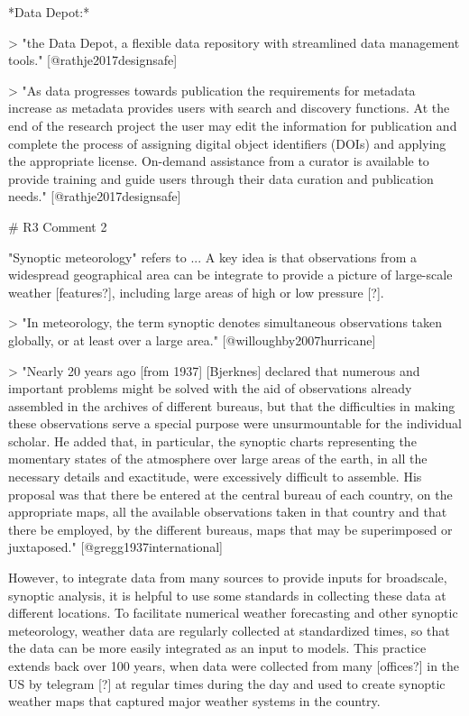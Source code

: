 *Data Depot:*

> "the Data Depot, a flexible data repository with streamlined data management
tools." [@rathje2017designsafe]

> "As data progresses towards publication the requirements for metadata 
increase as metadata provides users with search and discovery functions. At
the end of the research project the user may edit the information for 
publication and complete the process of assigning digital object identifiers
(DOIs) and applying the appropriate license. On-demand assistance from a 
curator is available to provide training and guide users through their data
curation and publication needs." [@rathje2017designsafe]

# R3 Comment 2

"Synoptic meteorology" refers to ...
A key idea is that observations from a widespread geographical area can be
integrate to provide a picture of large-scale weather [features?], including
large areas of high or low pressure [?].

> "In meteorology, the term synoptic denotes simultaneous observations taken
globally, or at least over a large area." [@willoughby2007hurricane]

> "Nearly 20 years ago [from 1937] [Bjerknes] declared that numerous and 
important problems might be solved with the aid of observations already 
assembled in the archives of different bureaus, but that the difficulties
in making these observations serve a special purpose were unsurmountable
for the individual scholar. He added that, in particular, the synoptic 
charts representing the momentary states of the atmosphere over large
areas of the earth, in all the necessary details and exactitude, were 
excessively difficult to assemble. His proposal was that there be entered
at the central bureau of each country, on the appropriate maps, all the available
observations taken in that country and that there be employed, by the different
bureaus, maps that may be superimposed or juxtaposed." [@gregg1937international]

However, to integrate data from many sources to provide inputs for broadscale,
synoptic analysis, it is helpful to use some standards in collecting these data
at different locations. To facilitate numerical weather forecasting and other
synoptic meteorology, weather data are regularly collected at standardized
times, so that the data can be more easily integrated as an input to models.
This practice extends back over 100 years, when data were collected from many
[offices?] in the US by telegram [?] at regular times during the day and used to
create synoptic weather maps that captured major weather systems in the country.

